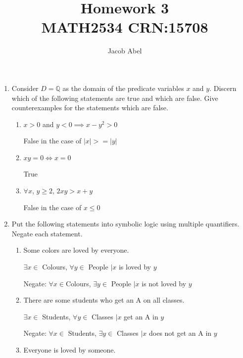 \documentclass[12pt,letterpaper,titlepage]{article}
\author{Jacob Abel}
\title{	Homework 3
	\\\large MATH2534 CRN:15708
}
\begin{document}
\maketitle
\begin{raggedright}

\begin{enumerate}
\item Consider $D = \mathbb{Q}$ as the domain of the predicate variables $x$ and $y$. Discern which of the following statements are true and which are false. Give counterexamples for the statements which are false.

  \begin{enumerate}[label=(\alph*)]
    \item $x > 0$ and $y < 0 \implies x − y^2 > 0$

	  False in the case of $|x| >= |y|$    
    
    \item $xy = 0 \iff x = 0$

	  True    
    
    \item $\forall x$, $y \geq 2$, $2xy > x + y$
    
	  False in the case of $x \leq 0$
    
  \end{enumerate}
  

\item Put the following statements into symbolic logic using multiple quantifiers. Negate each statement.

  \begin{enumerate}[label=(\alph*)]
    \item Some colors are loved by everyone.

	  $\exists x \in$ Colours, $\forall y \in$ People $| x$ is loved by $y$
	  
	  Negate: $\forall x \in $Colours, $\exists y \in$ People $| x$ is not loved by $y$

    \item There are some students who get an A on all classes.

	  $\exists x \in$ Students, $\forall y \in$ Classes $| x$ get an A in $y$

	  Negate: $\forall x \in$ Students, $\exists y \in$ Classes $| x$ does not get an A in $y$

    \item Everyone is loved by someone.


\end{enumerate}
\end{enumerate}
\end{raggedright}
\end{document}
